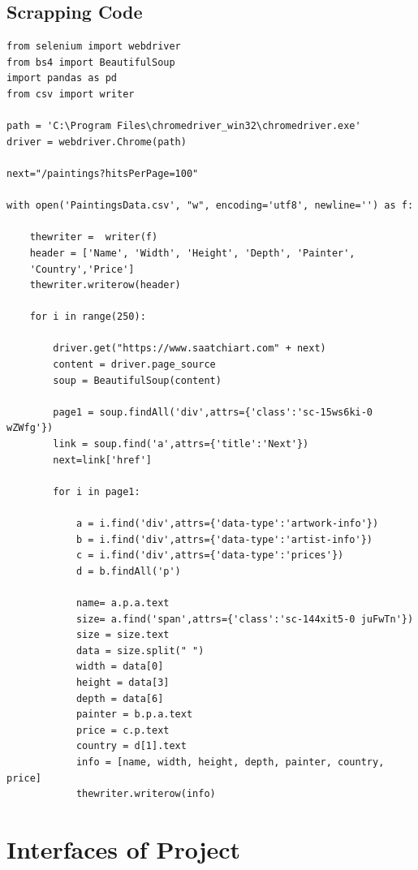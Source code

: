 \documentclass[12pt]{article}
\begin{document}
    \subsection{Scrapping Code}
    \begin{verbatim}
from selenium import webdriver
from bs4 import BeautifulSoup
import pandas as pd
from csv import writer

path = 'C:\Program Files\chromedriver_win32\chromedriver.exe'
driver = webdriver.Chrome(path)

next="/paintings?hitsPerPage=100"

with open('PaintingsData.csv', "w", encoding='utf8', newline='') as f:
    
    thewriter =  writer(f)
    header = ['Name', 'Width', 'Height', 'Depth', 'Painter',
    'Country','Price']
    thewriter.writerow(header)

    for i in range(250):

        driver.get("https://www.saatchiart.com" + next)
        content = driver.page_source
        soup = BeautifulSoup(content)

        page1 = soup.findAll('div',attrs={'class':'sc-15ws6ki-0 wZWfg'})
        link = soup.find('a',attrs={'title':'Next'})
        next=link['href']

        for i in page1:

            a = i.find('div',attrs={'data-type':'artwork-info'})
            b = i.find('div',attrs={'data-type':'artist-info'})
            c = i.find('div',attrs={'data-type':'prices'})
            d = b.findAll('p')
            
            name= a.p.a.text
            size= a.find('span',attrs={'class':'sc-144xit5-0 juFwTn'})
            size = size.text
            data = size.split(" ")
            width = data[0]
            height = data[3]
            depth = data[6]
            painter = b.p.a.text
            price = c.p.text
            country = d[1].text
            info = [name, width, height, depth, painter, country, price]
            thewriter.writerow(info)
    \end{verbatim}
    
    \newpage
    \section{Interfaces of Project}
\end{document}
